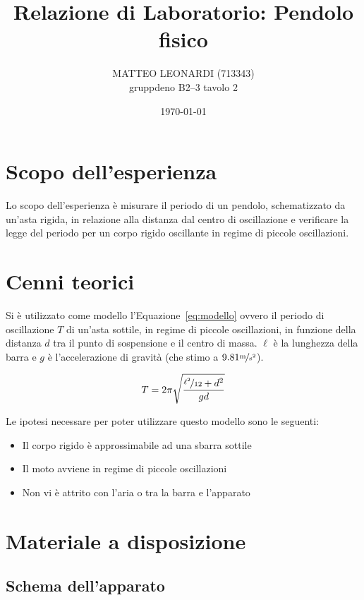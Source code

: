 \documentclass[a4paper,12pt]{article}
\title{Relazione di Laboratorio: Pendolo fisico}       %
\author{MATTEO LEONARDI (713343)\\ gruppdeno B2--3 tavolo 2}
\date{\today}
\begin{document}
\maketitle

\section{Scopo dell'esperienza}

Lo scopo dell'esperienza è misurare il periodo di un pendolo, schematizzato da un'asta rigida, in relazione alla distanza dal centro di oscillazione e verificare la legge del periodo per un corpo rigido oscillante in regime di piccole oscillazioni.

\section{Cenni teorici}

Si è utilizzato come modello l'Equazione~\ref{eq:modello} ovvero il periodo di oscillazione $T$ di un'asta sottile, in regime di piccole oscillazioni, in funzione della distanza $d$ tra il punto di sospensione e il centro di massa. $\ell$ è la lunghezza della barra e $g$ è l'accelerazione di gravità (che stimo a $9.81 \nicefrac{\text{m}}{\text{s}^2}$).

\begin{equation}
    T = 2 \pi \sqrt{\dfrac{\nicefrac{\ell^2}{12}+d^2}{gd}}
    \label{eq:modello}
\end{equation}

Le ipotesi necessare per poter utilizzare questo modello sono le seguenti:

\begin{itemize}
    \item Il corpo rigido è approssimabile ad una sbarra sottile
    \item Il moto avviene in regime di piccole oscillazioni
    \item Non vi è attrito con l'aria o tra la barra e l'apparato 
\end{itemize}

\section{Materiale a disposizione}

\subsection{Schema dell'apparato}
\end{document}

